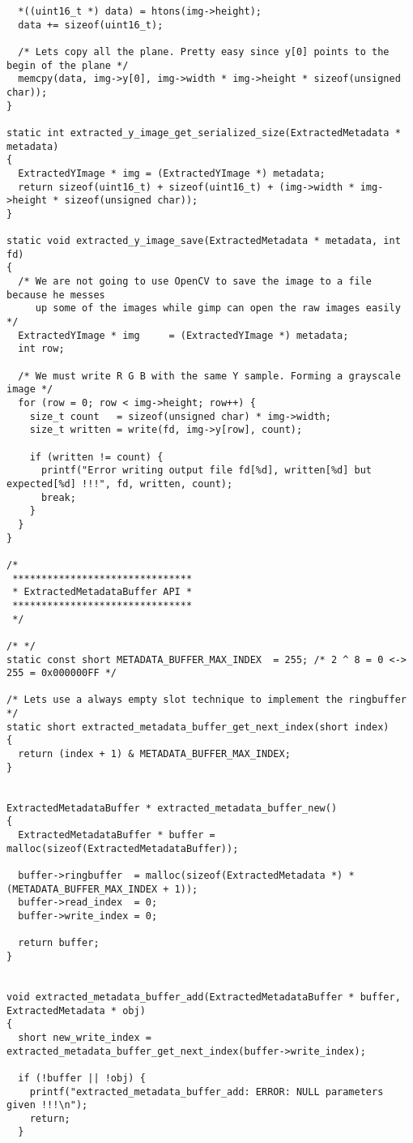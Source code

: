 \begin{lstlisting}
  *((uint16_t *) data) = htons(img->height);
  data += sizeof(uint16_t);

  /* Lets copy all the plane. Pretty easy since y[0] points to the begin of the plane */
  memcpy(data, img->y[0], img->width * img->height * sizeof(unsigned char));
}

static int extracted_y_image_get_serialized_size(ExtractedMetadata * metadata)
{
  ExtractedYImage * img = (ExtractedYImage *) metadata;
  return sizeof(uint16_t) + sizeof(uint16_t) + (img->width * img->height * sizeof(unsigned char));
}

static void extracted_y_image_save(ExtractedMetadata * metadata, int fd)
{
  /* We are not going to use OpenCV to save the image to a file because he messes 
     up some of the images while gimp can open the raw images easily */
  ExtractedYImage * img     = (ExtractedYImage *) metadata;
  int row;

  /* We must write R G B with the same Y sample. Forming a grayscale image */
  for (row = 0; row < img->height; row++) {
    size_t count   = sizeof(unsigned char) * img->width;
    size_t written = write(fd, img->y[row], count);
    
    if (written != count) {
      printf("Error writing output file fd[%d], written[%d] but expected[%d] !!!", fd, written, count);
      break;
    }
  }
}

/*
 *******************************
 * ExtractedMetadataBuffer API *
 *******************************
 */

/* */
static const short METADATA_BUFFER_MAX_INDEX  = 255; /* 2 ^ 8 = 0 <-> 255 = 0x000000FF */

/* Lets use a always empty slot technique to implement the ringbuffer */
static short extracted_metadata_buffer_get_next_index(short index)
{
  return (index + 1) & METADATA_BUFFER_MAX_INDEX;
}


ExtractedMetadataBuffer * extracted_metadata_buffer_new()
{
  ExtractedMetadataBuffer * buffer = malloc(sizeof(ExtractedMetadataBuffer));

  buffer->ringbuffer  = malloc(sizeof(ExtractedMetadata *) * (METADATA_BUFFER_MAX_INDEX + 1));
  buffer->read_index  = 0;
  buffer->write_index = 0;

  return buffer;
}


void extracted_metadata_buffer_add(ExtractedMetadataBuffer * buffer, ExtractedMetadata * obj)
{
  short new_write_index = extracted_metadata_buffer_get_next_index(buffer->write_index);

  if (!buffer || !obj) {
    printf("extracted_metadata_buffer_add: ERROR: NULL parameters given !!!\n");
    return;
  }


\end{lstlisting}

